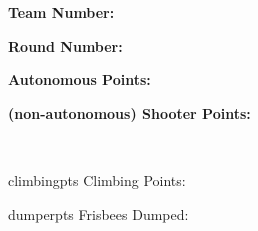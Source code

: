 \documentclass{article}
\begin{document}
{\noindent\begin{minipage}{.15\linewidth}
	\begin{center}
		\textbf{Team Number: \linebreak} \\[1em]
	\end{center}
\end{minipage}
\begin{minipage}{.17\linewidth} %
	\begin{center}
		\textbf{Round Number: \linebreak} \\[1em]
	\end{center}
\end{minipage}
\begin{minipage}{.2\linewidth}
	\begin{center}
		\textbf{Autonomous Points: \linebreak} \\[1em]
	\end{center}
\end{minipage}
\begin{minipage}{.2\linewidth} %
	\begin{center}
		\textbf{(non-autonomous) \linebreak Shooter Points:} \\[1em]
	\end{center}
\end{minipage}
\\[2em]

\noindent\begin{minipage}[t]{.2\linewidth} %
	\begin{question}{climbingpts}\QuestionIndicative
		Climbing Points:
		\begin{multicols}{2}
			\begin{choices}
			\end{choices}
		\end{multicols}
	\end{question}
\end{minipage}
\hspace*{1em}
\begin{minipage}[t]{.2\linewidth} %
	\begin{question}{dumperpts}\QuestionIndicative
		Frisbees Dumped:
		\begin{multicols}{2}\AMCBoxedAnswers
			\begin{choices} %
				\correctchoice{0}
				\correctchoice{1}
				\correctchoice{2}
				\correctchoice{3}
				\correctchoice{4}
				\correctchoice{5}
				\correctchoice{6}
			\end{choices}
		\end{multicols}
	\end{question}
\end{minipage}

}
\end{document}
